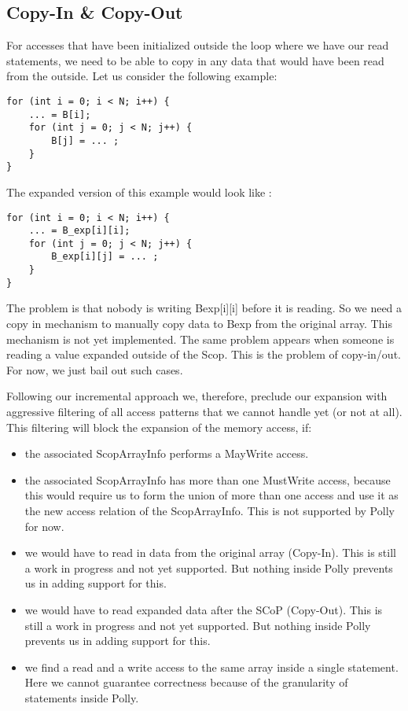 \subsection{Copy-In & Copy-Out}
For accesses that have been initialized outside the loop where we have our read statements, we need to be able to copy in any data that would have been read from the outside. Let us consider the following example:

\begin{lstlisting}[frame=single]
for (int i = 0; i < N; i++) {
    ... = B[i];
    for (int j = 0; j < N; j++) {
        B[j] = ... ;
    }
}
\end{lstlisting}

The expanded version of this example would look like :

\begin{lstlisting}[frame=single]
for (int i = 0; i < N; i++) {
    ... = B_exp[i][i];
    for (int j = 0; j < N; j++) {
        B_exp[i][j] = ... ;
    }
}

\end{lstlisting}

The problem is that nobody is writing Bexp[i][i] before it is reading. So we need a copy in mechanism to manually copy data to Bexp from the original array. This mechanism is not yet implemented. The same problem appears when someone is reading a value expanded outside of the Scop. This is the problem of copy-in/out. For now, we just bail out such cases.

Following our incremental approach we, therefore, preclude our expansion with aggressive filtering of all access patterns that we cannot handle yet (or not at all). This filtering will block the expansion of the memory access, if:
\begin{itemize}
\item the associated ScopArrayInfo performs a MayWrite access.
\item the associated ScopArrayInfo has more than one MustWrite access, because this would require us to form the union of more than one access and use it as the new access relation of the ScopArrayInfo. This is not supported by Polly for now.
\item we would have to read in data from the original array (Copy-In). This is still a work in progress and not yet supported. But nothing inside Polly prevents us in adding support for this.
\item we would have to read expanded data after the SCoP (Copy-Out). This is still a work in progress and not yet supported. But nothing inside Polly prevents us in adding support for this.
\item we find a read and a write access to the same array inside a single statement. Here we cannot guarantee correctness because of the granularity of statements inside Polly.


\end{itemize}
